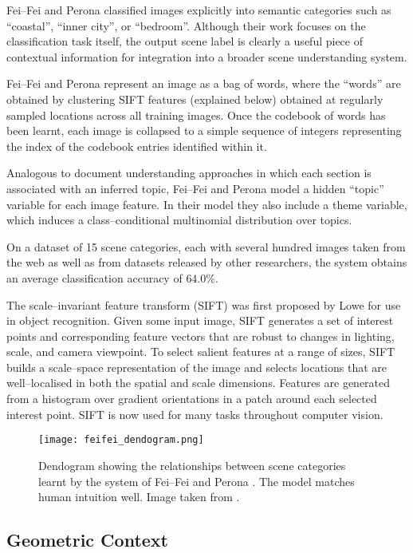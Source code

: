 Fei--Fei and Perona \cite{Fei-fei05} classified images
explicitly into semantic categories such as ``coastal'', ``inner
city'', or ``bedroom''. Although their work focuses on the
classification task itself, the output scene label is clearly a useful
piece of contextual information for integration into a broader scene
understanding system.

Fei--Fei and Perona represent an image as a bag of words, where the
``words'' are obtained by clustering SIFT features (explained below)
obtained at regularly sampled locations across all training
images. Once the codebook of words has been learnt, each image is
collapsed to a simple sequence of integers representing the index of
the codebook entries identified within it.

Analogous to document understanding approaches in which each section
is associated with an inferred topic, Fei--Fei and Perona model a
hidden ``topic'' variable for each image feature. In their model they
also include a theme variable, which induces a class--conditional
multinomial distribution over topics.

On a dataset of 15 scene categories, each with several hundred images
taken from the web as well as from datasets released by other
researchers, the system obtains an average classification accuracy of
$64.0\%$.

The scale--invariant feature transform (SIFT) was first proposed by
Lowe \cite{Lowe99} for use in object recognition. Given some input
image, SIFT generates a set of interest points and corresponding
feature vectors that are robust to changes in lighting, scale, and
camera viewpoint. To select salient features at a range of sizes, SIFT
builds a scale--space representation of the image \cite{Lindeberg93}
and selects locations that are well--localised in both the spatial and
scale dimensions. Features are generated from a histogram over
gradient orientations in a patch around each selected interest
point. SIFT is now used for many tasks throughout computer vision.

\begin{figure}[tb]
\centering
\texttt{[image: feifei\_dendogram.png]}
\caption{Dendogram showing the relationships between scene categories
  learnt by the system of Fei--Fei and Perona \cite{Fei-fei05}. The
  model matches human intuition well. Image taken from
  \cite{Fei-fei05}.}
\label{fig:dendogram}
\end{figure}

\subsection{Geometric Context}

